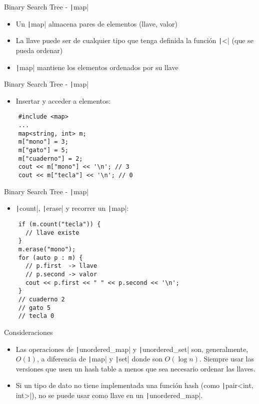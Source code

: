 \documentclass[10pt]{beamer}
\newcommand{\bi}{\begin{itemize}}
\newcommand{\ei}{\end{itemize}}
\begin{document}
\begin{frame}[fragile]{Binary Search Tree - \texttt|map|}
  \bi
    \item Un \texttt|map| almacena pares de elementos (llave, valor)
    \item La llave puede ser de cualquier tipo que tenga definida la función \texttt|<| (que se pueda ordenar)
    \item \texttt|map| mantiene los elementos ordenados por su llave
  \ei
\end{frame}

\begin{frame}[fragile]{Binary Search Tree - \texttt|map|}
  \bi
    \item Insertar y acceder a elementos:
  \ei
  \begin{verbatim}
    #include <map>
    ...
    map<string, int> m;
    m["mono"] = 3;
    m["gato"] = 5;
    m["cuaderno"] = 2;
    cout << m["mono"] << '\n'; // 3
    cout << m["tecla"] << '\n'; // 0
  \end{verbatim}
\end{frame}

\begin{frame}[fragile]{Binary Search Tree - \texttt|map|}
  \bi
    \item \texttt|count|, \texttt|erase| y recorrer un \texttt|map|:
  \ei
  \begin{verbatim}
    if (m.count("tecla")) {
      // llave existe
    }
    m.erase("mono");
    for (auto p : m) {
      // p.first  -> llave
      // p.second -> valor
      cout << p.first << " " << p.second << '\n';
    }
    // cuaderno 2
    // gato 5
    // tecla 0
  \end{verbatim}
\end{frame}

\begin{frame}[fragile]{Consideraciones}
  \bi
    \item Las operaciones de \texttt|unordered_map| y \texttt|unordered_set| 
    son, generalmente, $O(1)$, a diferencia de \texttt|map| y \texttt|set| 
    donde son $O(\log n)$. Siempre usar las versiones que usen un hash table a menos que 
    sea necesario ordenar las llaves.
    \item Si un tipo de dato no tiene implementada una función hash 
    (como \texttt|pair<int, int>|), no se puede usar como llave
    en un \texttt|unordered_map|.
  \ei
\end{frame}
\end{document}
